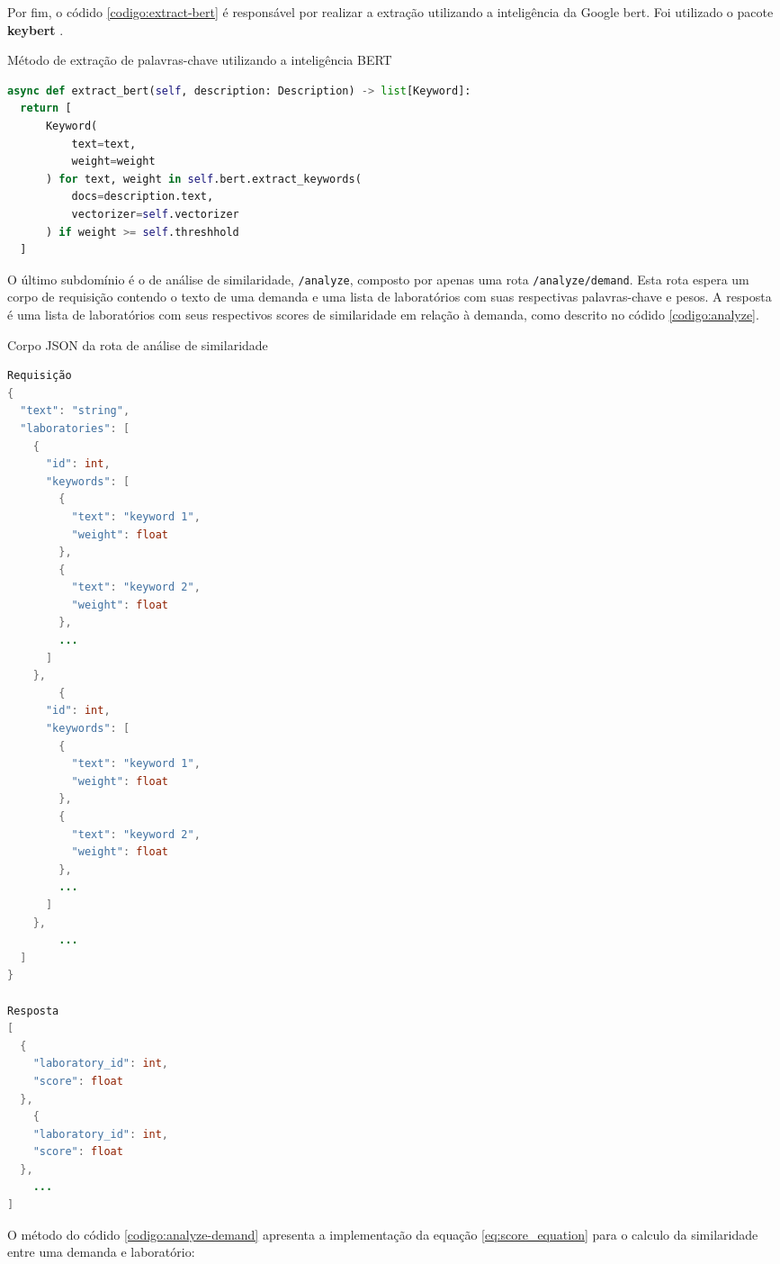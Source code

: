 Por fim, o códido \ref{codigo:extract-bert} é responsável por realizar a extração utilizando a inteligência da Google \gls{bert}. Foi utilizado o pacote \textbf{keybert} \cite{grootendorst2020keybert}.

\begin{sourcecode}[H]
  \caption{\label{codigo:extract-bert}Método de extração de palavras-chave utilizando a inteligência BERT}
  \begin{lstlisting}[frame=single, language=Python]
async def extract_bert(self, description: Description) -> list[Keyword]:
  return [
      Keyword(
          text=text, 
          weight=weight
      ) for text, weight in self.bert.extract_keywords(
          docs=description.text, 
          vectorizer=self.vectorizer
      ) if weight >= self.threshhold
  ]
\end{lstlisting}
  \fonte{}
\end{sourcecode}

O último subdomínio é o de análise de similaridade, \texttt{/analyze}, composto por apenas uma rota \texttt{/analyze/demand}. Esta rota espera um corpo de requisição contendo o texto de uma demanda e uma lista de laboratórios com suas respectivas palavras-chave e pesos. A resposta é uma lista de laboratórios com seus respectivos scores de similaridade em relação à demanda, como descrito no códido \ref{codigo:analyze}.

\begin{sourcecode}[H]
  \caption{\label{codigo:analyze}Corpo JSON da rota de análise de similaridade}
  \begin{lstlisting}[frame=single, language=Java]
Requisição
{
  "text": "string",
  "laboratories": [
    {
      "id": int,
      "keywords": [
        {
          "text": "keyword 1",
          "weight": float
        },
        {
          "text": "keyword 2",
          "weight": float
        },
        ...
      ]
    },
        {
      "id": int,
      "keywords": [
        {
          "text": "keyword 1",
          "weight": float
        },
        {
          "text": "keyword 2",
          "weight": float
        },
        ...
      ]
    },
        ...
  ]
}

Resposta
[
  {
    "laboratory_id": int,
    "score": float
  },
    {
    "laboratory_id": int,
    "score": float
  },
    ...
]
\end{lstlisting}
  \fonte{}
\end{sourcecode}

O método do códido \ref{codigo:analyze-demand} apresenta a implementação da equação \ref{eq:score_equation} para o calculo da similaridade entre uma demanda e laboratório:


